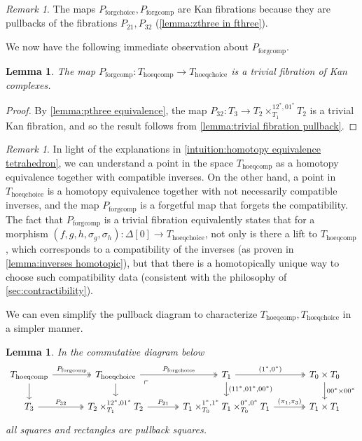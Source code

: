 \documentclass[11pt, a4paper]{amsart}
\newcommand{\hoeqchoice}{\mathrm{hoeqchoice}}
\newcommand{\hoeqcomp}{\mathrm{hoeqcomp}}
\newcommand{\forgcomp}{\mathrm{forgcomp}}
\newcommand{\forgchoice}{\mathrm{forgchoice}}
\newtheorem{lemma}[equation]{Lemma}
\theoremstyle{definition}
\theoremstyle{remark}
\newtheorem{remark}[equation]{Remark}
\numberwithin{equation}{section}
\begin{document}
\begin{remark} \label{rem:kan fibrations hoeqchoice}
  The maps $P_{\forgchoice}, P_{\forgcomp}$ are Kan fibrations because they are pullbacks of the fibrations $P_{21}, P_{32}$ (\cref{lemma:zthree in fthree}).
\end{remark}

We now have the following immediate observation about $P_{\forgcomp}$.

\begin{lemma} \label{lemma:hoeqcomp hoeqchoice equivalence}
  The map $P_{\forgcomp}\colon T_{\hoeqcomp} \to T_{\hoeqchoice}$ is a trivial fibration of Kan complexes.
\end{lemma}

\begin{proof}
  By \cref{lemma:pthree equivalence}, the map $P_{32}\colon T_3 \to T_2 \times^{12^*,01^*}_{T_1} T_2$ is a trivial Kan fibration, and so the result follows from \cref{lemma:trivial fibration pullback}.
\end{proof}

\begin{remark}
 In light of the explanations in \cref{intuition:homotopy equivalence tetrahedron}, we can understand a point in the space $T_{\hoeqcomp}$ as a homotopy equivalence together with compatible inverses. On the other hand, a point in $T_{\hoeqchoice}$ is a homotopy equivalence together with not necessarily compatible inverses, and the map $P_{\forgcomp}$ is a forgetful map that forgets the compatibility. The fact that $P_{\forgcomp}$ is a trivial fibration equivalently states that for a morphism $(f,g,h, \sigma_g, \sigma_h)\colon \Delta[0] \to T_\hoeqchoice$, not only is there a lift to $T_{\hoeqcomp}$, which corresponds to a compatibility of the inverses (as proven in \cref{lemma:inverses homotopic}), but that there is a homotopically unique way to choose such compatibility data (consistent with the philosophy of \cref{sec:contractibility}).
\end{remark}

We can even simplify the pullback diagram to characterize $T_{\hoeqcomp},T_{\hoeqchoice}$ in a simpler manner.
 
 \begin{lemma} \label{lemma:hoeqchoice second}
 In the commutative diagram below 
 \[
   \begin{tikzcd}[row sep=0.5cm, column sep=1.2cm]
    T_{\hoeqcomp} \arrow[d] \arrow[r, "P_{\forgcomp}", twoheadrightarrow] & T_{\hoeqchoice} \arrow[d] \arrow[r, "P_{\forgchoice}", twoheadrightarrow] \arrow[dr, phantom, "\ulcorner", very near start] & T_1 \arrow[d, "{(11^* , 01^* , 00^*)}"] \arrow[r, "{(1^* , 0^*)}", twoheadrightarrow] & T_0 \times T_0 \arrow[d, "00^* \times 00^*"]\\
    T_3 \arrow[r, "P_{32}", twoheadrightarrow] &  T_2 \times^{12^*,01^*}_{T_1} T_2 \arrow[r, "P_{21}", twoheadrightarrow] & T_1 \times^{1^*,1^*}_{T_0} T_1 \times^{0^*,0^*}_{T_0} T_1 \arrow[r, "{(\pi_1,\pi_3)}", twoheadrightarrow] &  T_1 \times T_1 
   \end{tikzcd}
  \]
  all squares and rectangles are pullback squares.
 \end{lemma}
\end{document}

